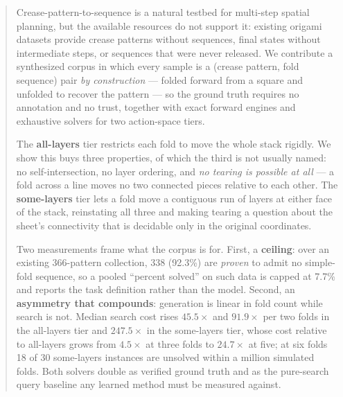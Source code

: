 %
%

\begin{abstract}
Crease-pattern-to-sequence is a natural testbed for multi-step spatial planning, but the
available resources do not support it: existing origami datasets provide crease patterns
without sequences, final states without intermediate steps, or sequences that were never
released. We contribute a synthesized corpus in which every sample is a (crease pattern, fold
sequence) pair \emph{by construction} --- folded forward from a square and unfolded to recover
the pattern --- so the ground truth requires no annotation and no trust, together with exact
forward engines and exhaustive solvers for two action-space tiers.

The \textbf{all-layers} tier restricts each fold to move the whole stack rigidly. We show this
buys three properties, of which the third is not usually named: no self-intersection, no layer
ordering, and \emph{no tearing is possible at all} --- a fold across a line moves no two
connected pieces relative to each other. The \textbf{some-layers} tier lets a fold move a
contiguous run of layers at either face of the stack, reinstating all three and making tearing
a question about the sheet's connectivity that is decidable only in the original coordinates.

Two measurements frame what the corpus is for. First, a \textbf{ceiling}: over an existing
366-pattern collection, 338 (92.3\%) are \emph{proven} to admit no simple-fold sequence, so a
pooled ``percent solved'' on such data is capped at 7.7\% and reports the task definition
rather than the model. Second, an \textbf{asymmetry that compounds}: generation is linear in
fold count while search is not. Median search cost rises $45.5\times$ and $91.9\times$ per two
folds in the all-layers tier and $247.5\times$ in the some-layers tier, whose cost relative to
all-layers grows from $4.5\times$ at three folds to $24.7\times$ at five; at six folds 18 of 30
some-layers instances are unsolved within a million simulated folds. Both solvers double as
verified ground truth and as the pure-search query baseline any learned method must be measured
against.
\end{abstract}
